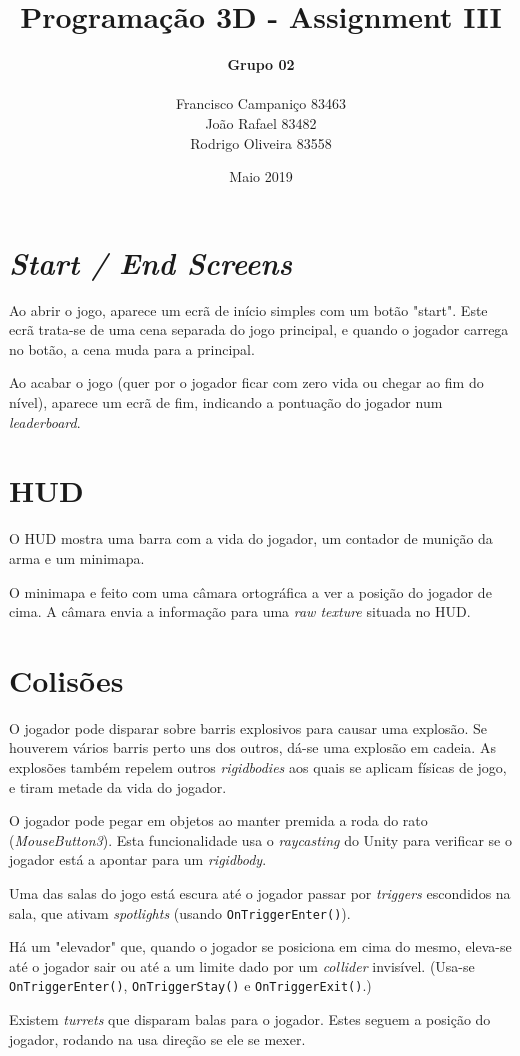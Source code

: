 \documentclass{article}
\title{
    \textbf{Programação 3D - Assignment III}
    }
\author{
    \begin{Large}
        \textbf{Grupo 02}
    \end{Large}\\
    Francisco Campaniço 83463\\
    João Rafael 83482\\
    Rodrigo Oliveira 83558
}
\date{Maio 2019}
\begin{document}
    \maketitle

    \section*{\textit{Start / End Screens}}
        \par
        Ao abrir o jogo, aparece um ecrã de início simples com um botão "start". Este ecrã trata-se de uma cena separada do jogo principal, e quando o jogador carrega no botão, a cena muda para a principal.
        \par
        Ao acabar o jogo (quer por o jogador ficar com zero vida ou chegar ao fim do nível), aparece um ecrã de fim, indicando a pontuação do jogador num \textit{leaderboard}.
    \section*{HUD}
        \par
        O HUD mostra uma barra com a vida do jogador, um contador de munição da arma e um minimapa.
        \par
        O minimapa e feito com uma câmara ortográfica a ver a posição do jogador de cima. A câmara envia a informação para uma \textit{raw texture} situada no HUD.

    \section*{Colisões}
        \par
        O jogador pode disparar sobre barris explosivos para causar uma explosão. Se houverem vários barris perto uns dos outros, dá-se uma explosão em cadeia. As explosões também repelem outros \textit{rigidbodies} aos quais se aplicam físicas de jogo, e tiram metade da vida do jogador.
        \par
        O jogador pode pegar em objetos ao manter premida a roda do rato (\textit{MouseButton3}). Esta funcionalidade usa o \textit{raycasting} do Unity para verificar se o jogador está a apontar para um \textit{rigidbody}.
        \par
        Uma das salas do jogo está escura até o jogador passar por \textit{triggers} escondidos na sala, que ativam \textit{spotlights} (usando \texttt{OnTriggerEnter()}).
        \par
        Há um "elevador" que, quando o jogador se posiciona em cima do mesmo, eleva-se até o jogador sair ou até a um limite dado por um \textit{collider} invisível. (Usa-se \texttt{OnTriggerEnter()}, \texttt{OnTriggerStay()} e \texttt{OnTriggerExit()}.)
        \par
        Existem \textit{turrets} que disparam balas para o jogador. Estes seguem a posição do jogador, rodando na usa direção se ele se mexer.
\end{document}
